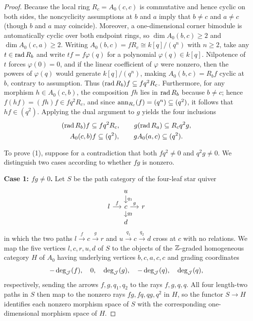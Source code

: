 \begin{proof}
Because the local ring $R_c=A_0(c,c)$ is commutative and hence cyclic on both sides, the noncyclicity assumptions at $b$ and $a$ imply that $b\ne c$ and $a\ne c$ (though $b$ and $a$ may coincide). Moreover, a one-dimensional corner bimodule is automatically cyclic over both endpoint rings, so $\dim A_0(b,c)\geq2$ and $\dim A_0(c,a)\geq2$. Writing $A_0(b,c)=fR_c\cong k[q]/(q^n)$ with $n\geq2$, take any $t\in\operatorname{rad} R_b$ and write $tf=f\varphi(q)$ for a polynomial $\varphi(q)\in k[q]$. Nilpotence of $t$ forces $\varphi(0)=0$, and if the linear coefficient of $\varphi$ were nonzero, then the powers of $\varphi(q)$ would generate $k[q]/(q^n)$, making $A_0(b,c)=R_bf$ cyclic at $b$, contrary to assumption. Thus $(\operatorname{rad} R_b)f\subseteq fq^2R_c$. Furthermore, for any morphism $h\in A_0(c,b)$, the composition $fh$ lies in $\operatorname{rad} R_b$ because $b\ne c$; hence $f(hf)=(fh)f\in fq^2R_c$, and since $\operatorname{ann}_{R_c}(f)=(q^n)\subseteq(q^2)$, it follows that $hf\in(q^2)$. Applying the dual argument to $g$ yields the four inclusions
\begin{equation}
  \begin{gathered}
    (\operatorname{rad} R_b)f\subseteq fq^2R_c,\qquad
    g(\operatorname{rad} R_a)\subseteq R_cq^2g,\\
    A_0(c,b)f\subseteq(q^2),\qquad
    gA_0(a,c)\subseteq(q^2).
  \end{gathered}
  \label{eq:opposite-control-inclusions}
\end{equation}

To prove (1), suppose for a contradiction that both $fq^2\ne0$ and $q^2g\ne0$. We distinguish two cases according to whether $fg$ is nonzero.

\smallskip
\noindent\textbf{Case 1: $fg\ne0$.}
Let $S$ be the path category of the four-leaf star quiver
\[
\begin{tikzcd}[row sep=small,column sep=small]
  & u\arrow[d,"q_1"] & \\
l\arrow[r,"f"] & c\arrow[r,"g"]\arrow[d,"q_2"] & r \\
  & d &
\end{tikzcd}
\]
in which the two paths $l\xrightarrow{f}c\xrightarrow{g}r$ and $u\xrightarrow{q_1}c\xrightarrow{q_2}d$ cross at $c$ with no relations. We map the five vertices $l,c,r,u,d$ of $S$ to the objects of the $\mathbb Z$-graded homogeneous category $H$ of $A_0$ having underlying vertices $b,c,a,c,c$ and grading coordinates
\[
  -\deg_\mathcal J(f),\quad 0,\quad \deg_\mathcal J(g),\quad -\deg_\mathcal J(q),\quad \deg_\mathcal J(q),
\]
respectively, sending the arrows $f,g,q_1,q_2$ to the rays $f,g,q,q$. All four length-two paths in $S$ then map to the nonzero rays $fg,fq,qg,q^2$ in $H$, so the functor $S\to H$ identifies each nonzero morphism space of $S$ with the corresponding one-dimensional morphism space of $H$.


\end{proof}
